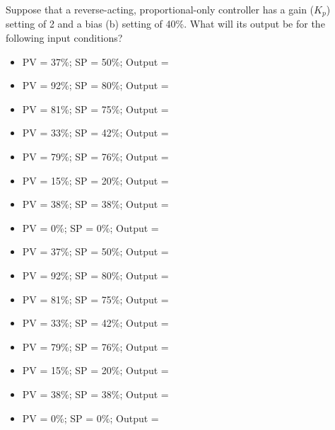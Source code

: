 

Suppose that a reverse-acting, proportional-only controller has a gain ($K_p$) setting of 2 and a bias (b) setting of 40\%.  What will its output be for the following input conditions?

\begin{itemize}
\item{}PV = 37\%; SP = 50\%; Output = \underbar{\hskip 50pt}
\vskip 5pt
\item{}PV = 92\%; SP = 80\%; Output = \underbar{\hskip 50pt}
\vskip 5pt
\item{}PV = 81\%; SP = 75\%; Output = \underbar{\hskip 50pt}
\vskip 5pt
\item{}PV = 33\%; SP = 42\%; Output = \underbar{\hskip 50pt}
\vskip 5pt
\item{}PV = 79\%; SP = 76\%; Output = \underbar{\hskip 50pt}
\vskip 5pt
\item{}PV = 15\%; SP = 20\%; Output = \underbar{\hskip 50pt}
\vskip 5pt
\item{}PV = 38\%; SP = 38\%; Output = \underbar{\hskip 50pt}
\vskip 5pt
\item{}PV = 0\%; SP = 0\%; Output = \underbar{\hskip 50pt}
\end{itemize} 







\begin{itemize}
\item{}PV = 37\%; SP = 50\%; Output = 
\vskip 5pt
\item{}PV = 92\%; SP = 80\%; Output = 
\vskip 5pt
\item{}PV = 81\%; SP = 75\%; Output = 
\vskip 5pt
\item{}PV = 33\%; SP = 42\%; Output = 
\vskip 5pt
\item{}PV = 79\%; SP = 76\%; Output = 
\vskip 5pt
\item{}PV = 15\%; SP = 20\%; Output = 
\vskip 5pt
\item{}PV = 38\%; SP = 38\%; Output = 
\vskip 5pt
\item{}PV = 0\%; SP = 0\%; Output = 
\end{itemize} 












